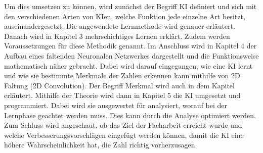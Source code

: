 \documentclass[11pt]{article}
\begin{document}
Um dies umsetzen zu können, wird zunächst der Begriff KI definiert und sich mit den verschiedenen Arten von KIen,
welche Funktion jede einzelne Art besitzt, auseinandergesetzt. Die angewendete Lernmethode wird genauer erläutert.
Danach wird in Kapitel 3 mehrschichtiges Lernen erklärt. Zudem werden Voraussetzungen für diese Methodik genannt. Im Anschluss wird in Kapitel 4
der Aufbau eines faltenden Neuronalen Netzwerkes dargestellt und die Funktionsweise mathematisch näher gebracht. Dabei wird darauf eingegangen, wie eine KI
lernt und wie sie bestimmte Merkmale der Zahlen erkennen kann mithilfe von 2D Faltung (2D Convolution). Der Begriff Merkmal wird auch in dem Kapitel erläutert.
Mithilfe der Theorie wird dann in Kapitel 5 die KI umgesetzt und programmiert. Dabei wird sie ausgewertet für analysiert, worauf bei der Lernphase
geachtet werden muss. Dies kann durch die Analyse optimiert werden. Zum Schluss wird angeschaut, ob das Ziel der Facharbeit erreicht wurde und welche
Verbesserungsvorschlägen eingefügt werden können, damit die KI eine höhere Wahrscheinlichkeit hat, die Zahl richtig vorherzusagen.
\end{document}
